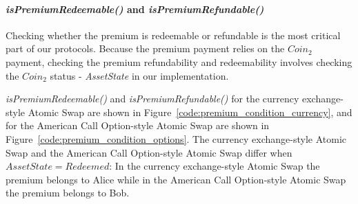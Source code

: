 \paragraph{\textit{isPremiumRedeemable()} and \textit{isPremiumRefundable()}}
Checking whether the premium is redeemable or refundable is the most critical part of our protocols.
Because the premium payment relies on the $Coin_2$ payment, checking the premium refundability and redeemability involves checking the $Coin_2$ status - \textit{AssetState} in our implementation.

\textit{isPremiumRedeemable()} and \textit{isPremiumRefundable()} for the currency exchange-style Atomic Swap are shown in Figure~\ref{code:premium_condition_currency}, and for the American Call Option-style Atomic Swap are shown in Figure~\ref{code:premium_condition_options}.
The currency exchange-style Atomic Swap and the American Call Option-style Atomic Swap differ when $AssetState = Redeemed$:
In the currency exchange-style Atomic Swap the premium belongs to Alice while in the American Call Option-style Atomic Swap the premium belongs to Bob.

